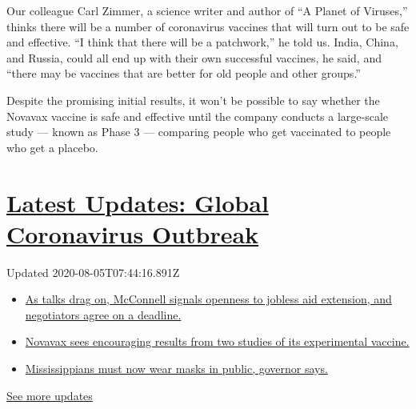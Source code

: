 Our colleague Carl Zimmer, a science writer and author of ``A Planet of
Viruses,'' thinks there will be a number of coronavirus vaccines that
will turn out to be safe and effective. ``I think that there will be a
patchwork,'' he told us. India, China, and Russia, could all end up with
their own successful vaccines, he said, and ``there may be vaccines that
are better for old people and other groups.''

Despite the promising initial results, it won't be possible to say
whether the Novavax vaccine is safe and effective until the company
conducts a large-scale study --- known as Phase 3 --- comparing people
who get vaccinated to people who get a placebo.

\hypertarget{latest-updates-global-coronavirus-outbreak}{%
\section{\texorpdfstring{\href{https://www.nytimes.com/2020/08/04/world/coronavirus-cases.html?action=click\&pgtype=Article\&state=default\&region=MAIN_CONTENT_1\&context=storylines_live_updates}{Latest
Updates: Global Coronavirus
Outbreak}}{Latest Updates: Global Coronavirus Outbreak}}\label{latest-updates-global-coronavirus-outbreak}}

Updated 2020-08-05T07:44:16.891Z

\begin{itemize}
\tightlist
\item
  \href{https://www.nytimes.com/2020/08/04/world/coronavirus-cases.html?action=click\&pgtype=Article\&state=default\&region=MAIN_CONTENT_1\&context=storylines_live_updates\#link-762df92}{As
  talks drag on, McConnell signals openness to jobless aid extension,
  and negotiators agree on a deadline.}
\item
  \href{https://www.nytimes.com/2020/08/04/world/coronavirus-cases.html?action=click\&pgtype=Article\&state=default\&region=MAIN_CONTENT_1\&context=storylines_live_updates\#link-1228a480}{Novavax
  sees encouraging results from two studies of its experimental
  vaccine.}
\item
  \href{https://www.nytimes.com/2020/08/04/world/coronavirus-cases.html?action=click\&pgtype=Article\&state=default\&region=MAIN_CONTENT_1\&context=storylines_live_updates\#link-794484ed}{Mississippians
  must now wear masks in public, governor says.}
\end{itemize}

\href{https://www.nytimes.com/2020/08/04/world/coronavirus-cases.html?action=click\&pgtype=Article\&state=default\&region=MAIN_CONTENT_1\&context=storylines_live_updates}{See
more updates}

